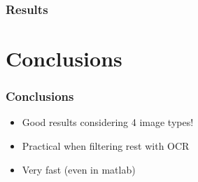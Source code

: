 \documentclass{beamer}
\begin{document}
\frame
{
  \frametitle{Results}
	\begin{figure}[!ht]
	\centering


	\end{figure}
}

\section{Conclusions}
\frame
{
  \frametitle{Conclusions}
	
  \begin{itemize}
  \item <+-| alert@+> Good results considering 4 image types!
  \item <+-| alert@+> Practical when filtering rest with OCR
  \item <+-| alert@+> Very fast (even in matlab)
  \end{itemize}
}
\end{document}
